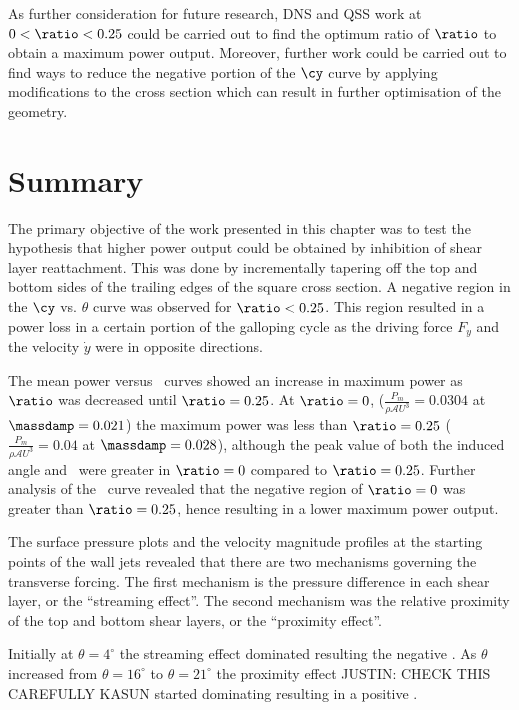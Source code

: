   As further consideration for future research, DNS and QSS work at $0<\ratio<0.25$ could be carried out to find the optimum ratio of $\ratio$ to obtain a maximum power output. Moreover, further work could be carried out to find ways to reduce the negative portion of the $\cy$ curve by applying modifications to the cross section which can result in further optimisation of the geometry.
 
 \section{Summary} 
 \label{sec:summary-diff-cross-sec}
 
 The primary objective of the work presented in this chapter was to test the hypothesis that higher power output could be obtained by inhibition of shear layer reattachment. This was done by incrementally tapering off the top and bottom sides of the trailing edges of the square cross section. A negative region in the $\cy$ vs. $\theta$ curve was observed for $\ratio<0.25$. This region resulted in a power loss in a certain portion of the galloping cycle as the driving force $F_y$ and the velocity $\dot{y}$ were in opposite directions.
 
 The mean power versus \massdamp\ curves showed an increase in maximum power as $\ratio$ was decreased until $\ratio=0.25$. At $\ratio=0$,  ($\displaystyle\frac{P_{m}}{\rho \mathcal{A}U^3}=0.0304$ at $\massdamp=0.021$) the maximum power was less than $\ratio=0.25$ ($\displaystyle\frac{P_{m}}{\rho \mathcal{A}U^3}=0.04$ at $\massdamp=0.028$), although the peak value of both the induced angle and \cy\ were greater in $\ratio=0$ compared to $\ratio=0.25$. Further analysis of the \cy\ curve revealed that the negative region of $\ratio=0$  was greater than $\ratio=0.25$, hence resulting in a lower maximum power output. 
 
 The surface pressure plots and the velocity magnitude profiles at the starting points of the wall jets revealed  that there are two mechanisms governing the transverse forcing. The first mechanism is the pressure difference in each shear layer, or the ``streaming effect''. The second mechanism was the relative proximity of the top and bottom shear layers, or the ``proximity effect''.

 Initially at $\theta= 4^{\circ}$ the streaming effect dominated resulting the negative \cy. As $\theta$ increased from  $\theta= 16^{\circ}$ to  $\theta= 21^{\circ}$ the proximity effect JUSTIN: CHECK THIS CAREFULLY KASUN started dominating resulting in a positive \cy.
 
